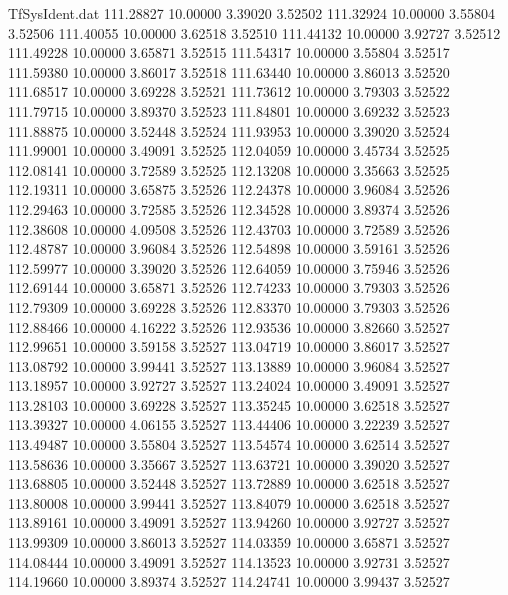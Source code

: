 \begin{filecontents}{TfSysIdent.dat}
 111.28827   10.00000    3.39020    3.52502
 111.32924   10.00000    3.55804    3.52506
 111.40055   10.00000    3.62518    3.52510
 111.44132   10.00000    3.92727    3.52512
 111.49228   10.00000    3.65871    3.52515
 111.54317   10.00000    3.55804    3.52517
 111.59380   10.00000    3.86017    3.52518
 111.63440   10.00000    3.86013    3.52520
 111.68517   10.00000    3.69228    3.52521
 111.73612   10.00000    3.79303    3.52522
 111.79715   10.00000    3.89370    3.52523
 111.84801   10.00000    3.69232    3.52523
 111.88875   10.00000    3.52448    3.52524
 111.93953   10.00000    3.39020    3.52524
 111.99001   10.00000    3.49091    3.52525
 112.04059   10.00000    3.45734    3.52525
 112.08141   10.00000    3.72589    3.52525
 112.13208   10.00000    3.35663    3.52525
 112.19311   10.00000    3.65875    3.52526
 112.24378   10.00000    3.96084    3.52526
 112.29463   10.00000    3.72585    3.52526
 112.34528   10.00000    3.89374    3.52526
 112.38608   10.00000    4.09508    3.52526
 112.43703   10.00000    3.72589    3.52526
 112.48787   10.00000    3.96084    3.52526
 112.54898   10.00000    3.59161    3.52526
 112.59977   10.00000    3.39020    3.52526
 112.64059   10.00000    3.75946    3.52526
 112.69144   10.00000    3.65871    3.52526
 112.74233   10.00000    3.79303    3.52526
 112.79309   10.00000    3.69228    3.52526
 112.83370   10.00000    3.79303    3.52526
 112.88466   10.00000    4.16222    3.52526
 112.93536   10.00000    3.82660    3.52527
 112.99651   10.00000    3.59158    3.52527
 113.04719   10.00000    3.86017    3.52527
 113.08792   10.00000    3.99441    3.52527
 113.13889   10.00000    3.96084    3.52527
 113.18957   10.00000    3.92727    3.52527
 113.24024   10.00000    3.49091    3.52527
 113.28103   10.00000    3.69228    3.52527
 113.35245   10.00000    3.62518    3.52527
 113.39327   10.00000    4.06155    3.52527
 113.44406   10.00000    3.22239    3.52527
 113.49487   10.00000    3.55804    3.52527
 113.54574   10.00000    3.62514    3.52527
 113.58636   10.00000    3.35667    3.52527
 113.63721   10.00000    3.39020    3.52527
 113.68805   10.00000    3.52448    3.52527
 113.72889   10.00000    3.62518    3.52527
 113.80008   10.00000    3.99441    3.52527
 113.84079   10.00000    3.62518    3.52527
 113.89161   10.00000    3.49091    3.52527
 113.94260   10.00000    3.92727    3.52527
 113.99309   10.00000    3.86013    3.52527
 114.03359   10.00000    3.65871    3.52527
 114.08444   10.00000    3.49091    3.52527
 114.13523   10.00000    3.92731    3.52527
 114.19660   10.00000    3.89374    3.52527
 114.24741   10.00000    3.99437    3.52527

\end{filecontents}
